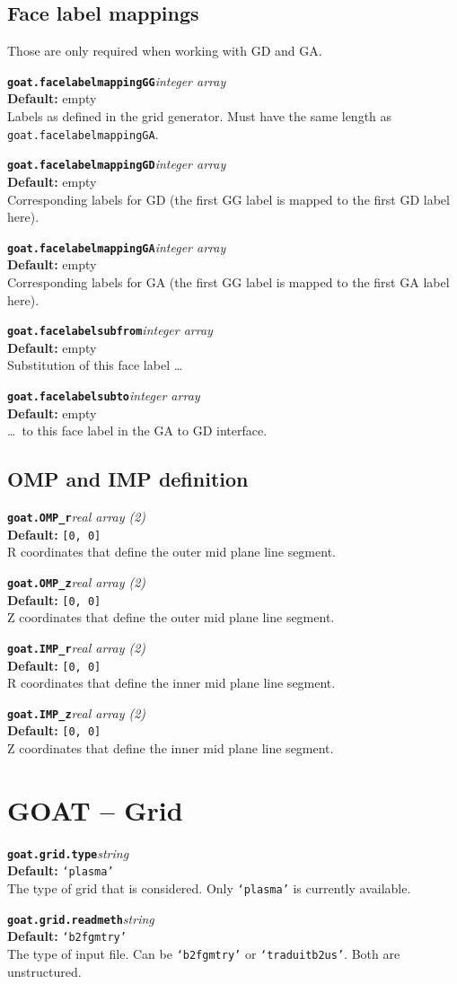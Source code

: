 \documentclass[10pt,a4paper]{article}
\newcommand{\sw}[4]{%
  \par\vspace{0.7em}%
  \begin{minipage}{\linewidth}\raggedright
    \textbf{\texttt{#1}}\hfill\textit{#2}\\[0.1em]
    \textbf{Default:} #3\\[0.1em]
    #4\par
    \vspace{0.3em}{\color{swgrey}\hrule}
  \end{minipage}\par}
\begin{document}
\subsection*{Face label mappings}
Those are only required when working with GD and GA.
\sw{goat.facelabelmappingGG}{integer array}{empty}{Labels as defined in the grid generator. Must have the same length as \texttt{goat.facelabelmappingGA}.}
\sw{goat.facelabelmappingGD}{integer array}{empty}{Corresponding labels for GD (the first GG label is mapped to the first GD label here).}
\sw{goat.facelabelmappingGA}{integer array}{empty}{Corresponding labels for GA (the first GG label is mapped to the first GA label here).}
\sw{goat.facelabelsubfrom}{integer array}{empty}{Substitution of this face label \dots}
\sw{goat.facelabelsubto}{integer array}{empty}{\dots\ to this face label in the GA to GD interface.}

\subsection*{OMP and IMP definition}
\sw{goat.OMP_r}{real array (2)}{\texttt{[0, 0]}}{R coordinates that define the outer mid plane line segment.}
\sw{goat.OMP_z}{real array (2)}{\texttt{[0, 0]}}{Z coordinates that define the outer mid plane line segment.}
\sw{goat.IMP_r}{real array (2)}{\texttt{[0, 0]}}{R coordinates that define the inner mid plane line segment.}
\sw{goat.IMP_z}{real array (2)}{\texttt{[0, 0]}}{Z coordinates that define the inner mid plane line segment.}


\section{GOAT -- Grid}
\sw{goat.grid.type}{string}{\texttt{`plasma'}}{The type of grid that is considered. Only \texttt{`plasma'} is currently available.}
\sw{goat.grid.readmeth}{string}{\texttt{`b2fgmtry'}}{The type of input file. Can be \texttt{`b2fgmtry'} or \texttt{`traduitb2us'}. Both are unstructured.}

\end{document}
